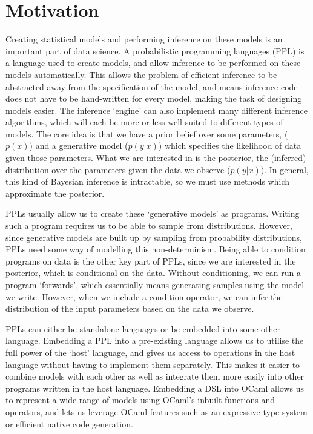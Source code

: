 \section{Motivation}

Creating statistical models and performing inference on these models is an important part of data science. A probabilistic programming languages (PPL) is a language used to create models, and allow inference to be performed on these models automatically. This allows the problem of efficient inference to be abstracted away from the specification of the model, and means inference code does not have to be hand-written for every model, making the task of designing models easier. The inference `engine' can also implement many different inference algorithms, which will each be more or less well-suited to different types of models. The core idea is that we have a prior belief over some parameters, ($p(x)$) and a generative model ($p(y|x)$) which specifies the likelihood of data given those parameters. What we are interested in is the posterior, the (inferred) distribution over the parameters given the data we observe ($p(y|x)$). In general, this kind of Bayesian inference is intractable, so we must use methods which approximate the posterior.

PPLs usually allow us to create these `generative models' as programs. Writing such a program requires us to be able to sample from distributions. However, since generative models are built up by sampling from probability distributions, PPLs need some way of modelling this non-determinism. Being able to condition programs on data is the other key part of PPLs, since we are interested in the posterior, which is conditional on the data. Without conditioning, we can run a program `forwards', which essentially means generating samples using the model we write. However, when we include a condition operator, we can infer the distribution of the input parameters based on the data we observe.

PPLs can either be standalone languages or be embedded into some other language. Embedding a PPL into a pre-existing language allows us to utilise the full power of the `host' language, and gives us access to operations in the host language without having to implement them separately. This makes it easier to combine models with each other as well as integrate them more easily into other programs written in the host language. Embedding a DSL into OCaml allows us to represent a wide range of models using OCaml's inbuilt functions and operators, and lets us leverage OCaml features such as an expressive type system or efficient native code generation.


